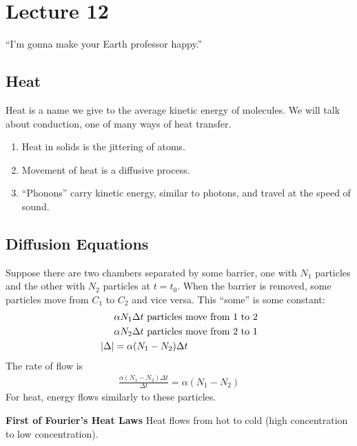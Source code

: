 \section{Lecture 12}
``I'm gonna make your Earth professor happy.''
\subsection{Heat}
Heat is a name we give to the average kinetic energy of molecules. We will talk about conduction, one of many ways of heat transfer.
\begin{enumerate}
    \item Heat in solids is the jittering of atoms.
    \item Movement of heat is a diffusive process.
    \item ``Phonons'' carry kinetic energy, similar to photons, and travel at the speed of sound.
\end{enumerate}

\subsection{Diffusion Equations}
Suppose there are two chambers separated by some barrier, one with $N_1$ particles and the other with $N_2$ particles at $t=t_0$. When the barrier is removed, some particles move from $C_1$ to $C_2$ and vice versa. This ``some'' is some constant:
\begin{align}
    &\alpha N_1 \Delta t \text{ particles move from 1 to 2}\\
    &\alpha N_2 \Delta t \text{ particles move from 2 to 1}\\
    \abs{\Delta} &= \alpha(N_1 - N_2) \Delta t
\end{align}
The rate of flow is
\begin{align}
    \frac{\alpha(N_1 - N_2) \Delta t}{\Delta t} = \alpha(N_1 - N_2)
\end{align}
For heat, energy flows similarly to these particles.
\begin{definition}
    \textbf{First of Fourier's Heat Laws} Heat flows from hot to cold (high concentration to low concentration).
\end{definition}

